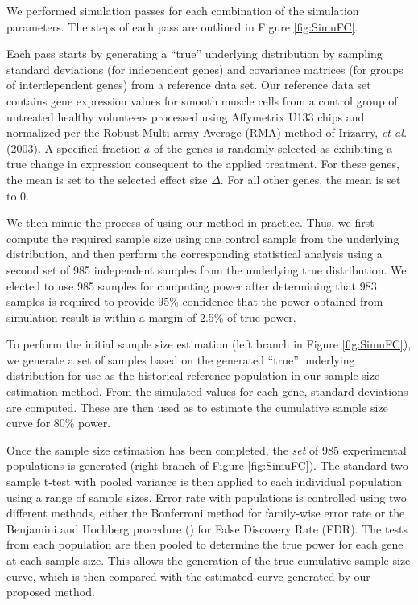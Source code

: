 \documentclass{bioinfo}
\begin{document}
We performed simulation passes for each combination of the
simulation parameters.  The steps of each pass are outlined in
Figure \ref{fig:SimuFC}.

Each pass starts by generating a ``true'' underlying distribution
by sampling standard deviations (for independent genes) and
covariance matrices (for groups of interdependent genes) from a
reference data set.  Our reference data set contains gene
expression values for smooth muscle cells from a control group of
untreated healthy volunteers processed using Affymetrix U133 chips
and normalized per the Robust Multi-array Average (RMA) method of
Irizarry, \textit{et al.} (2003).  A specified fraction $a$ of the
genes is randomly selected as exhibiting a true change in
expression consequent to the applied treatment. For these genes,
the mean is set to the selected effect size $\Delta$.  For all
other genes, the mean is set to $0$.

We then mimic the process of using our method in practice. Thus,
we first compute the required sample size using one control sample
from the underlying distribution, and then perform the
corresponding statistical analysis using a second set of 985
independent samples from the underlying true distribution.  We
elected to use 985 samples for computing power after determining
that 983 samples is required to provide 95\% confidence that the
power obtained from simulation result is within a margin of 2.5\%
of true power.

To perform the initial sample size estimation (left branch in
Figure \ref{fig:SimuFC}), we generate a set of samples based on
the generated ``true'' underlying distribution for use as the
historical reference population in our sample size estimation
method.  From the simulated values for each gene, standard
deviations are computed. These are then used as to estimate the
cumulative sample size curve for 80\% power.

Once the sample size estimation has been completed, the \emph{set}
of 985 experimental populations is generated (right branch of
Figure \ref{fig:SimuFC}).  The standard two-sample t-test with
pooled variance is then applied to each individual population
using a range of sample sizes. Error rate with populations is
controlled using two different methods, either the Bonferroni
method for family-wise error rate or the Benjamini and Hochberg
procedure (\citealp{Benjamini95}) for False Discovery Rate (FDR).
The tests from each population are then pooled to determine the
true power for each gene at each sample size. This allows the
generation of the true cumulative sample size curve, which is then
compared with the estimated curve generated by our proposed
method.
\end{document}
